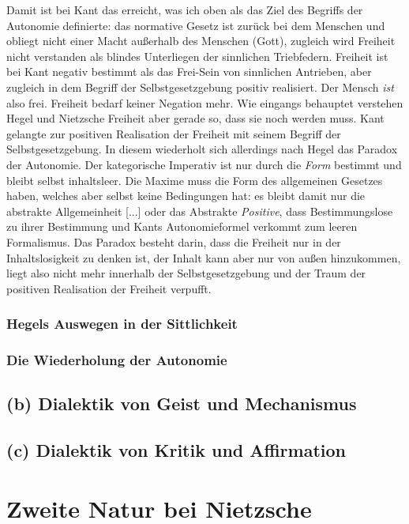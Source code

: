\documentclass[12pt, a4paper, openany]{report}
\begin{document}
Damit ist bei Kant das erreicht, was ich oben als das Ziel des Begriffs der Autonomie definierte: 
das normative Gesetz ist zurück bei dem Menschen und obliegt nicht einer Macht außerhalb des Menschen (Gott), zugleich wird Freiheit nicht verstanden als blindes Unterliegen der sinnlichen Triebfedern. 
Freiheit ist bei Kant negativ bestimmt als das Frei-Sein von sinnlichen Antrieben, aber zugleich in dem Begriff der Selbstgesetzgebung positiv realisiert. 
Der Mensch \textit{ist} also frei. 
Freiheit bedarf keiner Negation mehr.
Wie eingangs behauptet verstehen Hegel und Nietzsche Freiheit aber gerade so, dass sie noch werden muss. 
Kant gelangte zur positiven Realisation der Freiheit mit seinem Begriff der Selbstgesetzgebung. 
In diesem wiederholt sich allerdings nach Hegel das Paradox der Autonomie. Der kategorische Imperativ ist nur durch die \textit{Form} bestimmt und bleibt selbst inhaltsleer.
Die Maxime muss die Form des allgemeinen Gesetzes haben, welches aber selbst keine Bedingungen hat:
es \glqq bleibt damit nur die abstrakte Allgemeinheit [...] oder das Abstrakte \textit{Positive}, dass Bestimmungslose zu ihrer Bestimmung\grqq{} und Kants Autonomieformel verkommt zum \glqq leeren Formalismus\grqq.
Das Paradox besteht darin, dass die Freiheit nur in der Inhaltslosigkeit zu denken ist, der Inhalt kann aber nur von außen hinzukommen, liegt also nicht mehr innerhalb der Selbstgesetzgebung und der Traum der positiven Realisation der Freiheit verpufft.

\subsubsection{Hegels Auswegen in der Sittlichkeit}

\subsubsection{Die Wiederholung der Autonomie}


\subsection{(b) Dialektik von Geist und Mechanismus}
\subsection{(c) Dialektik von Kritik und Affirmation}
\section{Zweite Natur bei Nietzsche}\label{abschnitt_2}
\end{document}
